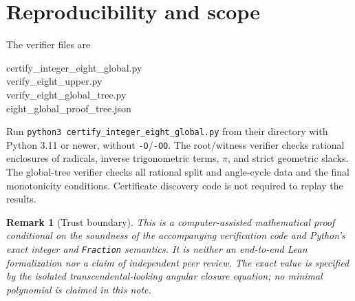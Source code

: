 \documentclass[10pt,a4paper]{article}
\newtheorem{remark}[theorem]{Remark}
\begin{document}
\section{Reproducibility and scope}
The verifier files are
\begin{center}
\begin{minipage}{.92\linewidth}\small\ttfamily
certify\_integer\_eight\_global.py\\
verify\_eight\_upper.py\\
verify\_eight\_global\_tree.py\\
eight\_global\_proof\_tree.json
\end{minipage}
\end{center}
Run \texttt{python3 certify\_integer\_eight\_global.py} from their directory with Python 3.11 or newer, without \texttt{-O}/\texttt{-OO}. The root/witness verifier checks rational enclosures of radicals, inverse trigonometric terms, $\pi$, and strict geometric slacks. The global-tree verifier checks all rational split and angle-cycle data and the final monotonicity conditions. Certificate discovery code is not required to replay the results.

\begin{remark}[Trust boundary]
This is a computer-assisted mathematical proof conditional on the soundness of the accompanying verification code and Python's exact integer and \texttt{Fraction} semantics. It is neither an end-to-end Lean formalization nor a claim of independent peer review. The exact value is specified by the isolated transcendental-looking angular closure equation; no minimal polynomial is claimed in this note.
\end{remark}
\end{document}
